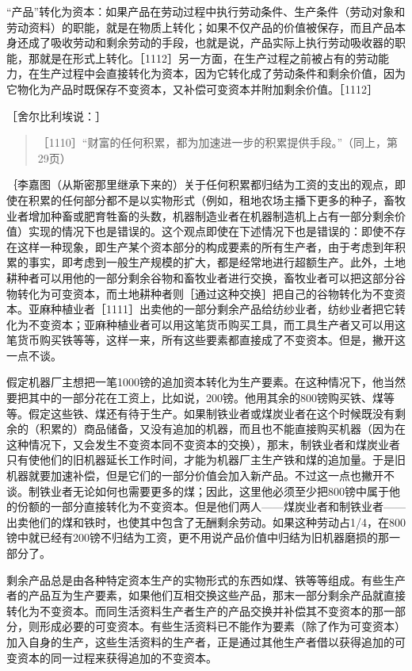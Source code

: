 “产品”转化为资本：如果产品在劳动过程中执行劳动条件、生产条件（劳动对象和劳动资料）的职能，就是在物质上转化；如果不仅产品的价值被保存，而且产品本身还成了吸收劳动和剩余劳动的手段，也就是说，产品实际上执行劳动吸收器的职能，那就是在形式上转化。［1112］另一方面，在生产过程之前被占有的劳动能力，在生产过程中会直接转化为资本，因为它转化成了劳动条件和剩余价值，因为它物化为产品时既保存不变资本，又补偿可变资本并附加剩余价值。［1112］


［舍尔比利埃说：］

\begin{quote}{［1110］“财富的任何积累，都为加速进一步的积累提供手段。”（同上，第29页）}\end{quote}

｛李嘉图（从斯密那里继承下来的）关于任何积累都归结为工资的支出的观点，即使在积累的任何部分都不是以实物形式（例如，租地农场主播下更多的种子，畜牧业者增加种畜或肥育牲畜的头数，机器制造业者在机器制造机上占有一部分剩余价值）实现的情况下也是错误的。这个观点即使在下述情况下也是错误的：即使不存在这样一种现象，即生产某个资本部分的构成要素的所有生产者，由于考虑到年积累的事实，即考虑到一般生产规模的扩大，都是经常地进行超额生产。此外，土地耕种者可以用他的一部分剩余谷物和畜牧业者进行交换，畜牧业者可以把这部分谷物转化为可变资本，而土地耕种者则［通过这种交换］把自己的谷物转化为不变资本。亚麻种植业者［1111］出卖他的一部分剩余产品给纺纱业者，纺纱业者把它转化为不变资本；亚麻种植业者可以用这笔货币购买工具，而工具生产者又可以用这笔货币购买铁等等，这样一来，所有这些要素都直接成了不变资本。但是，撇开这一点不谈。

假定机器厂主想把一笔1000镑的追加资本转化为生产要素。在这种情况下，他当然要把其中的一部分花在工资上，比如说，200镑。他用其余的800镑购买铁、煤等等。假定这些铁、煤还有待于生产。如果制铁业者或煤炭业者在这个时候既没有剩余的（积累的）商品储备，又没有追加的机器，而且也不能直接购买机器（因为在这种情况下，又会发生不变资本同不变资本的交换），那末，制铁业者和煤炭业者只有使他们的旧机器延长工作时间，才能为机器厂主生产铁和煤的追加量。于是旧机器就要加速补偿，但是它们的一部分价值会加入新产品。不过这一点也撇开不谈。制铁业者无论如何也需要更多的煤；因此，这里他必须至少把800镑中属于他的份额的一部分直接转化为不变资本。但是他们两人——煤炭业者和制铁业者——出卖他们的煤和铁时，也使其中包含了无酬剩余劳动。如果这种劳动占1/4，在800镑中就已经有200镑不归结为工资，更不用说产品价值中归结为旧机器磨损的那一部分了。

剩余产品总是由各种特定资本生产的实物形式的东西如煤、铁等等组成。有些生产者的产品互为生产要素，如果他们互相交换这些产品，那末一部分剩余产品就直接转化为不变资本。而同生活资料生产者生产的产品交换并补偿其不变资本的那一部分，则形成必要的可变资本。有些生活资料已不能作为要素（除了作为可变资本）加入自身的生产，这些生活资料的生产者，正是通过其他生产者借以获得追加的可变资本的同一过程来获得追加的不变资本。

